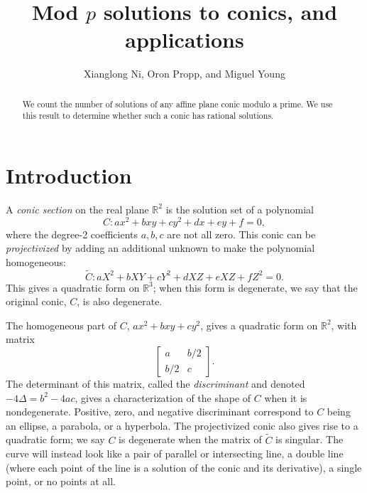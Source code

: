 \documentclass[10pt,a4paper]{amsart}
\numberwithin{equation}{section}
\numberwithin{figure}{section}
\numberwithin{table}{section}
\theoremstyle{definition}
\theoremstyle{plain}
\theoremstyle{remark}
\theoremstyle{plain}
\theoremstyle{definition}
\theoremstyle{plain}
\theoremstyle{plain}
\newcommand{\R}{\mathbb{R}}
\begin{document}
 
	
	\title{Mod $p$ solutions to conics, and applications} 
	\author{Xianglong Ni, Oron Propp, and Miguel Young}
	\maketitle
	
	\begin{abstract} 
		We count the number of solutions of any affine plane conic modulo a prime.
		We use this result to determine whether such a conic has rational solutions. 
	\end{abstract}
	
	\tableofcontents
	
	\section{Introduction}\label{sec:intro} 
	
	A \emph{conic section} on the real plane $\R^2$ is the solution set of 
	a polynomial
	\[ C: ax^2 + bxy + cy^2 + dx + ey + f = 0, \]
	where the degree-2 coefficients $a, b, c$ are not all zero. This conic can be \emph{projectivized} by adding an additional
	unknown to make the polynomial homogeneous:
	\[ \widetilde{C}: aX^2 + bXY + cY^2 + dXZ + eXZ + fZ^2 = 0. \]
	This gives a quadratic form on $\R^3$; when this form is degenerate, we
	say that the original conic, $C$, is also degenerate.
	
	The homogeneous part of $C$, $ax^2 + bxy + cy^2$, gives a quadratic form
	on $\R^2$, with matrix
	\[ \begin{bmatrix}
	a & b/2 \\
	b/2 & c
	\end{bmatrix}. \]
	The determinant of this matrix, called the \emph{discriminant} and
	denoted $-4\Delta = b^2 - 4ac$, gives a characterization of the shape of $C$
	when it is nondegenerate. Positive, zero, and negative discriminant
	correspond to $C$ being an ellipse, a parabola, or a hyperbola. The
	projectivized conic also gives rise to a quadratic form; we say $C$ is
	degenerate when the matrix of $\widetilde{C}$ is singular. The curve
	will instead look like a pair of parallel or intersecting line, a double
	line (where each point of the line is a solution of the conic and its 
	derivative), a single point, or no points at all.
	
\end{document}
